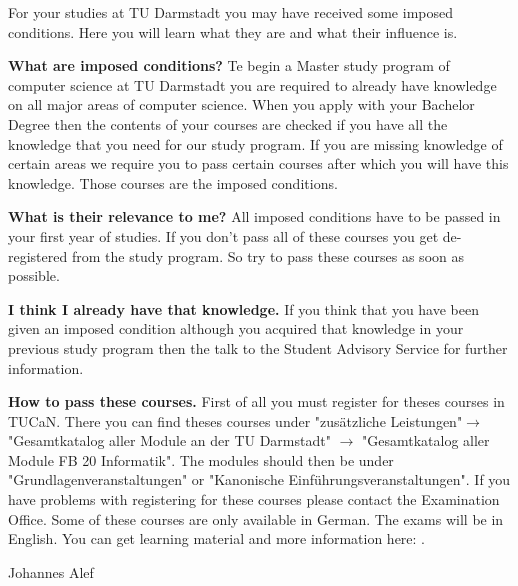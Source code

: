 {For your studies at TU Darmstadt you may have received some imposed conditions. Here you will learn what they are and what their influence is.
}{\noindent\textbf{What are imposed conditions?}
Te begin a Master study program of computer science at TU Darmstadt you are required to already have knowledge on all major areas of computer science.
When you apply with your Bachelor Degree then the contents of your courses are checked if you have all the knowledge that you need for our study program.
If you are missing knowledge of certain areas we require you to pass certain courses after which you will have this knowledge.
Those courses are the imposed conditions.

\noindent\textbf{What is their relevance to me?}
All imposed conditions have to be passed in your first year of studies.
If you don't pass all of these courses you get de-registered from the study program.
So try to pass these courses as soon as possible.

\noindent\textbf{I think I already have that knowledge.}
If you think that you have been given an imposed condition although you acquired that knowledge in your previous study program then the talk to the Student Advisory Service for further information.

\noindent\textbf{How to pass these courses.}
First of all you must register for theses courses in TUCaN.
There you can find theses courses under "zusätzliche Leistungen"$\rightarrow$"Gesamtkatalog aller Module an der TU Darmstadt" $\rightarrow$ "Gesamtkatalog aller Module FB 20 Informatik".
The modules should then be under "Grundlagenveranstaltungen" or "Kanonische Einführungsveranstaltungen".
If you have problems with registering for these courses please contact the Examination Office.
Some of these courses are only available in German.
The exams will be in English.
You can get learning material and more information here: \footnotemark[1].



}{Johannes Alef}

